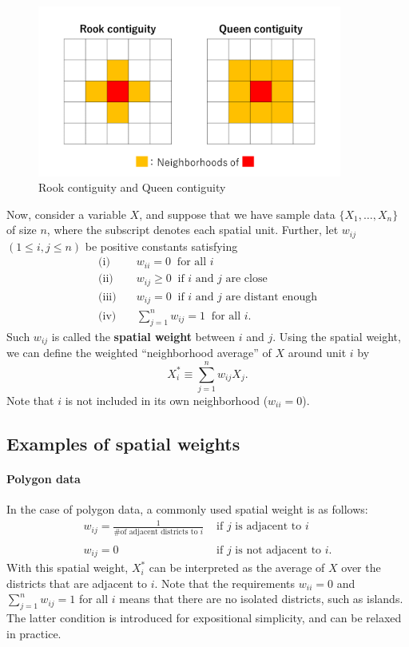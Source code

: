 \documentclass[10.5pt, A4paper, openany, uplatex]{book}
\numberwithin{equation}{section}
\begin{document}
\begin{figure}[h!]
	\begin{center}
		\includegraphics[width = 10cm]{adj.png}
		\caption{Rook contiguity and Queen contiguity\label{fig:contiguity}}
	\end{center}
\end{figure}

Now, consider a variable $X$, and suppose that we have sample data $\{X_1, \ldots, X_n\}$ of size $n$, where the subscript denotes each spatial unit.
Further, let $w_{ij}$ $(1 \le i,j \le n)$ be positive constants satisfying
\begin{align*}
\text{(i)} & \quad w_{ii} = 0  \;\; \text{for all $i$}\\
\text{(ii)} &\quad  w_{ij} \ge 0 \;\; \text{if $i$ and $j$ are close}\\
\text{(iii)} &\quad  w_{ij} = 0 \;\; \text{if $i$ and $j$ are distant enough}\\
\text{(iv)} &\quad  \sum_{j = 1}^n w_{ij} =1 \;\; \text{for all $i$}.
\end{align*} 
Such $w_{ij}$ is called the \textbf{spatial weight} between $i$ and $j$.
Using the spatial weight, we can define the weighted ``neighborhood average'' of $X$ around unit $i$ by
\[
	X_i^* \equiv \sum_{j=1}^n w_{ij} X_j.
\]
Note that $i$ is not included in its own neighborhood ($w_{ii} = 0$).

\subsection*{Examples of spatial weights}
\paragraph{Polygon data}
In the case of polygon data, a commonly used spatial weight is as follows:
\[
	\begin{array}{ll}
	w_{ij} = \frac{1}{\text{\# of adjacent districts to $i$}}& \text{ if $j$ is adjacent to $i$} \\
	& \\
	w_{ij} = 0 &  \text{ if $j$ is not adjacent to $i$.} 
	\end{array}
\]
With this spatial weight, $X_i^*$ can be interpreted as the average of $X$ over the districts that are adjacent to $i$.
Note that the requirements $w_{ii} = 0$ and $\sum_{j = 1}^n w_{ij} =1$ for all $i$ means that there are no isolated districts, such as islands.
The latter condition is introduced for expositional simplicity, and can be relaxed in practice.
\end{document}
